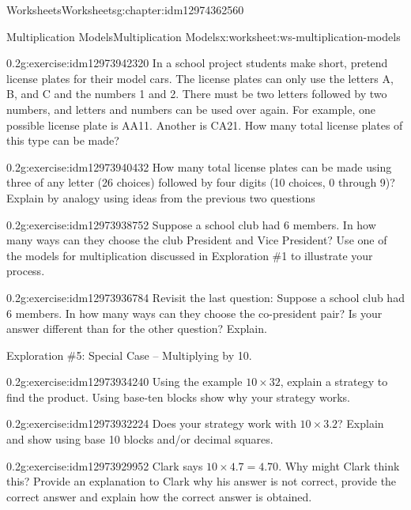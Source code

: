\documentclass[twoside,11pt,]{book}
\begin{document}
\begin{chapterptx}{Worksheets}{}{Worksheets}{}{}{g:chapter:idm12974362560}
\begin{worksheet-section-numberless}{Multiplication Models}{}{Multiplication Models}{}{}{x:worksheet:ws-multiplication-models}
\clearpage
\begin{divisionexercise}{12}{}{0.2}{g:exercise:idm12973942320}%
In a school project students make short, pretend license plates for their model cars.  The license plates can only use the letters A, B, and C and the numbers 1 and 2.  There must be two letters followed by two numbers, and letters and numbers can be used over again.  For example, one possible license plate is AA11. Another is CA21. How many total license plates of this type can be made?%
\end{divisionexercise}%
\begin{divisionexercise}{13}{}{0.2}{g:exercise:idm12973940432}%
How many total license plates can be made using three of any letter (26 choices) followed by four digits (10 choices, 0 through 9)?  Explain by analogy using ideas from the previous two questions%
\end{divisionexercise}%
\begin{divisionexercise}{14}{}{0.2}{g:exercise:idm12973938752}%
Suppose a school club had 6 members. In how many ways can they choose the club President and Vice President? Use one of the models for multiplication discussed in Exploration \#1 to illustrate your process.%
\end{divisionexercise}%
\clearpage
\begin{divisionexercise}{15}{}{0.2}{g:exercise:idm12973936784}%
Revisit the last question: Suppose a school club had 6 members. In how many ways can they choose the co-president pair? Is your answer different than for the other question?  Explain.%
\end{divisionexercise}%
\begin{introduction}{}%
Exploration \#5: Special Case – Multiplying by 10.\end{introduction}%
\begin{divisionexercise}{16}{}{0.2}{g:exercise:idm12973934240}%
Using the example \(10 \times 32 \), explain a strategy to find the product. Using base-ten blocks show why your strategy works.%
\end{divisionexercise}%
\begin{divisionexercise}{17}{}{0.2}{g:exercise:idm12973932224}%
Does your strategy work with \(10 \times 3.2 \)? Explain and show using base 10 blocks and\slash{}or decimal squares.%
\end{divisionexercise}%
\clearpage
\begin{divisionexercise}{18}{}{0.2}{g:exercise:idm12973929952}%
Clark says \(10 \times 4.7=4.70 \). Why might Clark think this? Provide an explanation to Clark why his answer is not correct, provide the correct answer and explain how the correct answer is obtained.%
\end{divisionexercise}%
\end{worksheet-section-numberless}
\restoregeometry
\end{chapterptx}
\end{document}
